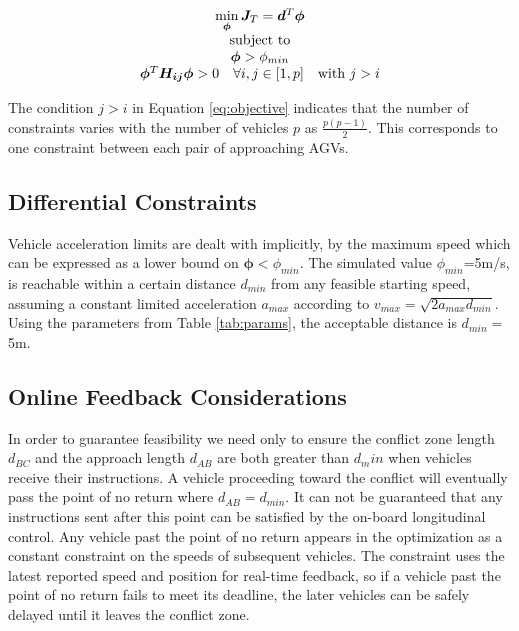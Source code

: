 \begin{equation}
	\label{eq:objective}
	\begin{array}{c}
		\min \limits_{\bm{\phi}} \bm{J}_T = \bm{d}^T\bm{\phi} \\ 
		$subject to$\\
		\bm{\phi} > \phi_{min} \\
		\bm{\phi}^T \bm{H_{ij}} \bm{\phi} > 0 \quad \forall i, j \in [1,p] \quad $with $ j > i \\
	\end{array}
\end{equation}

The condition $j > i$ in Equation \ref{eq:objective} indicates that the number of constraints varies with the number of vehicles $p$ as $\frac{p(p-1)}{2}$. This corresponds to one constraint between each pair of approaching AGVs.

\subsection{Differential Constraints}
Vehicle acceleration limits are dealt with implicitly, by the maximum speed which can be expressed as a lower bound on $\bm{\phi} < \phi_{min}$. The simulated value $\phi_{min}$=5m/s, is reachable within a certain distance $d_{min}$ from any feasible starting speed, assuming a constant limited acceleration $a_{max}$ according to $v_{max} = \sqrt{2 a_{max} d_{min}} $. Using the parameters from Table \ref{tab:params}, the acceptable distance is $d_{min}=$5m.

\subsection{Online Feedback Considerations}
In order to guarantee feasibility we need only to ensure the conflict zone length $d_{BC}$ and the approach length $d_{AB}$ are both greater than $d_min$ when vehicles receive their instructions. A vehicle proceeding toward the conflict will eventually pass the point of no return where $d_{AB} = d_{min}$. It can not be guaranteed that any instructions sent after this point can be satisfied by the on-board longitudinal control. Any vehicle past the point of no return appears in the optimization as a constant constraint on the speeds of subsequent vehicles. The constraint uses the latest reported speed and position for real-time feedback, so if a vehicle past the point of no return fails to meet its deadline, the later vehicles can be safely delayed until it leaves the conflict zone.  

